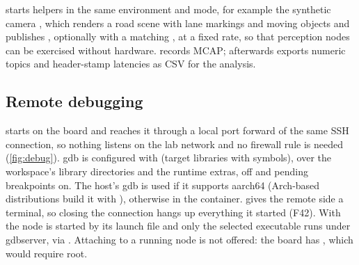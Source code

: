 \documentclass[11pt,a4paper]{article}
\newcommand{\finding}[1]{\textsf{\small F#1}}
\begin{document}
 starts helpers in the same environment and mode, for example the synthetic camera
, which renders a road scene with lane markings and moving objects and publishes
, optionally with a matching , at a fixed rate, so that perception nodes can
be exercised without hardware.  records MCAP; afterwards  exports numeric topics and
header-stamp latencies as CSV for the analysis.

\subsection{Remote debugging}\label{sec:debug}
 starts  on the board and reaches it
through a local port forward of the same SSH connection, so nothing listens on the lab network and no firewall rule
is needed (\cref{fig:debug}). gdb is configured with  (target libraries with symbols),
 over the workspace's library directories and the runtime extras,  off and
pending breakpoints on. The host's gdb is used if it supports aarch64 (Arch-based distributions build it with
), otherwise  in the container.  gives the remote side a
terminal, so closing the connection hangs up everything it started (\finding{42}). With  the
node is started by its launch file and only the selected executable runs under gdbserver, via
. Attaching to a running node is
not offered: the board has , which would require root.
\end{document}
